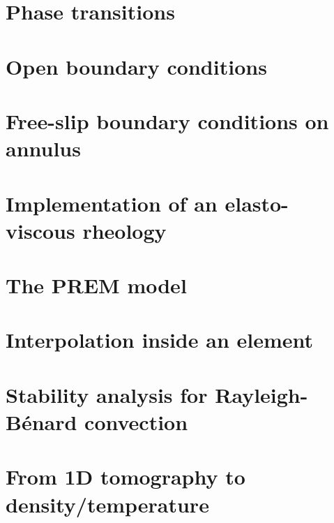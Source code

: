 \section{Phase transitions}\label{ss:phasetransitions} %
\newpage %
\section{Open boundary conditions}\label{ss:openbc} %
\newpage %
\section{Free-slip boundary conditions on annulus}\label{ss:fsbc_annulus} %
\newpage %
\section{Implementation of an elasto-viscous rheology} \label{ss:evrheo}  %
\newpage %
\section{The PREM model} \label{ss:prem}  %
\newpage %
\section{Interpolation inside an element} \label{ss:bern}  %
\newpage %
\section{Stability analysis for Rayleigh-B\'enard convection} \label{ss:sarb}  %
\newpage %
\section{From 1D tomography to density/temperature}  %
\newpage %
